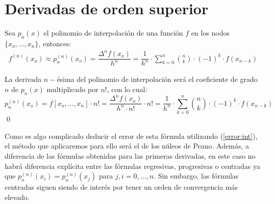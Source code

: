         \section{Derivadas de orden superior}
\begin{prop}
Sea $p_n(x)$ el polinomio de interpolación de una función $f$ en los nodos $\{x_o,\ldots,x_n\}$, entonces:
\begin{align}
f^{(n)}(x_o)\approx p^{(n)}_n(x_o)=\dfrac{\Delta^nf(x_o)}{h^n}=\dfrac{1}{h^n}\cdot \sum_{k=0}^n\binom{n}{k}\cdot (-1)^k\cdot f(x_{n-k})
\label{formula:derivadan}
\end{align}
\end{prop}
\begin{dem}
La derivada $n-$ésima del polinomio de interpolación será el coeficiente de grado $n$ de $p_n(x)$ multiplicado por $n!$, con lo cual:
$$p^{(n)}_n(x_o)=f[x_o,\ldots,x_n]\cdot n!=\dfrac{\Delta^n f(x_o)}{h^n\cdot n!}\cdot n!=\dfrac{1}{h^n}\cdot \sum_{k=0}^n\binom{n}{k}\cdot (-1)^k\cdot f(x_{n-k})$$
\qed\end{dem}
\begin{obs}
Como es algo complicado deducir el error de esta fórmula utilizando (\ref{error:int}), el método que aplicaremos para ello será el de los núleos de Peano. Además, a diferencia  de las fórmulas obtenidas para las primeras derivadas, en este caso no habrá diferencia explícita entre las fórmulas regresivas, progresivas o centradas ya que $p_n^{(n)}(x_i)=p_n^{(n)}(x_j)$ para $j,i=0,\ldots,n$. Sin embargo, las fórmulas centradas siguen siendo de interés por tener un orden de convergencia más elevado.
\end{obs}
